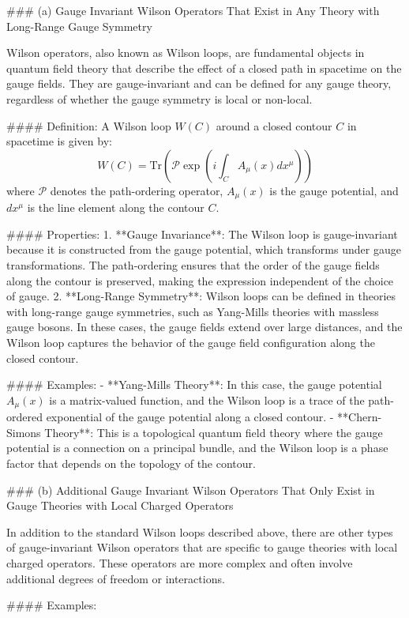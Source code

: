 ### (a) Gauge Invariant Wilson Operators That Exist in Any Theory with Long-Range Gauge Symmetry

Wilson operators, also known as Wilson loops, are fundamental objects in quantum field theory that describe the effect of a closed path in spacetime on the gauge fields. They are gauge-invariant and can be defined for any gauge theory, regardless of whether the gauge symmetry is local or non-local.

#### Definition:
A Wilson loop \( W(C) \) around a closed contour \( C \) in spacetime is given by:
\[
W(C) = \text{Tr} \left( \mathcal{P} \exp \left( i \int_C A_\mu(x) dx^\mu \right) \right)
\]
where \( \mathcal{P} \) denotes the path-ordering operator, \( A_\mu(x) \) is the gauge potential, and \( dx^\mu \) is the line element along the contour \( C \).

#### Properties:
1. **Gauge Invariance**: The Wilson loop is gauge-invariant because it is constructed from the gauge potential, which transforms under gauge transformations. The path-ordering ensures that the order of the gauge fields along the contour is preserved, making the expression independent of the choice of gauge.
2. **Long-Range Symmetry**: Wilson loops can be defined in theories with long-range gauge symmetries, such as Yang-Mills theories with massless gauge bosons. In these cases, the gauge fields extend over large distances, and the Wilson loop captures the behavior of the gauge field configuration along the closed contour.

#### Examples:
- **Yang-Mills Theory**: In this case, the gauge potential \( A_\mu(x) \) is a matrix-valued function, and the Wilson loop is a trace of the path-ordered exponential of the gauge potential along a closed contour.
- **Chern-Simons Theory**: This is a topological quantum field theory where the gauge potential is a connection on a principal bundle, and the Wilson loop is a phase factor that depends on the topology of the contour.

### (b) Additional Gauge Invariant Wilson Operators That Only Exist in Gauge Theories with Local Charged Operators

In addition to the standard Wilson loops described above, there are other types of gauge-invariant Wilson operators that are specific to gauge theories with local charged operators. These operators are more complex and often involve additional degrees of freedom or interactions.

#### Examples:

